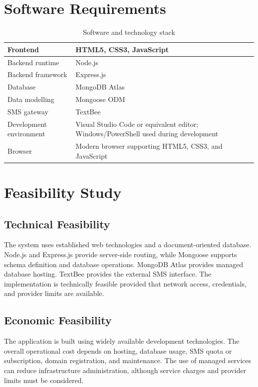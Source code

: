 \documentclass[12pt,a4paper,oneside]{report}
\begin{document}
\section{Software Requirements}
\begin{table}[H]
\centering
\caption{Software and technology stack}
\begin{tabularx}{\textwidth}{|p{4cm}|X|}
\hline
Frontend & HTML5, CSS3, JavaScript\\ \hline
Backend runtime & Node.js\\ \hline
Backend framework & Express.js\\ \hline
Database & MongoDB Atlas\\ \hline
Data modelling & Mongoose ODM\\ \hline
SMS gateway & TextBee\\ \hline
Development environment & Visual Studio Code or equivalent editor; Windows/PowerShell used during development\\ \hline
Browser & Modern browser supporting HTML5, CSS3, and JavaScript\\ \hline
\end{tabularx}
\end{table}

\section{Feasibility Study}
\subsection{Technical Feasibility}
The system uses established web technologies and a document-oriented database. Node.js and Express.js provide server-side routing, while Mongoose supports schema definition and database operations. MongoDB Atlas provides managed database hosting. TextBee provides the external SMS interface. The implementation is technically feasible provided that network access, credentials, and provider limits are available.

\subsection{Economic Feasibility}
The application is built using widely available development technologies. The overall operational cost depends on hosting, database usage, SMS quota or subscription, domain registration, and maintenance. The use of managed services can reduce infrastructure administration, although service charges and provider limits must be considered.
\end{document}

